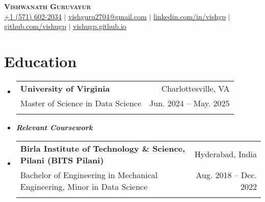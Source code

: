 \documentclass[letter paper,11pt]{article}
\makeatletter
\newcommand{\resumeSubheading}[5]{%
  \item
    \begin{tabular*}
    {1\textwidth}
    {l@{\extracolsep{\fill}}r}
      \textbf{#1} & \small#2 \\
      {\small#3} & {\small #4} \\
      {\small#5}
    \end{tabular*}%
  \vspace{-0.8cm}
}
\newcommand{\resumeSubHeadingListStart}{\begin{itemize}[leftmargin=0.0in, label={}]}
\newcommand{\resumeSubHeadingListEnd}{\end{itemize}}
\makeatother
\begin{document}


\begin{center}
    \textbf{\Huge \scshape Vishwanath Guruvayur} \\ 
    \vspace{7pt}
    \small 
    \href{tel:+1 (571) 602-2034}{\underline{+1 (571) 602-2034}} $|$ \href{mailto:vishvesh2704@gmail.com}{\underline{vishguru2704@gmail.com}} $|$ 
    \href{https://linkedin.com/in/vishgp}{\underline{linkedin.com/in/vishgp}} $|$
    \href{https://github.com/vishugp}{\underline{github.com/vishugp}} $|$
    \href{https://vishugp.github.io}{\underline{vishugp.github.io}}
\end{center}


\section{Education}
    \resumeSubHeadingListStart
    \resumeSubheading
         {\textbf{University of Virginia}}{Charlottesville, VA}
        {Master of Science in Data Science}{Jun. 2024 -- May. 2025}{}

        \item\small{{\textit{\textbf{{Relevant Coursework}}}}}
        \vspace{-0.25cm}
    \justifying

 \vspace{0.05cm}
        
    \resumeSubheading
        {\textbf{Birla Institute of Technology \& Science, Pilani (BITS Pilani)}}{Hyderabad, India}
        {Bachelor of Engineering in Mechanical Engineering, Minor in Data Science}{Aug. 2018 -- Dec. 2022}{}


 \resumeSubHeadingListEnd 
%
\end{document}
